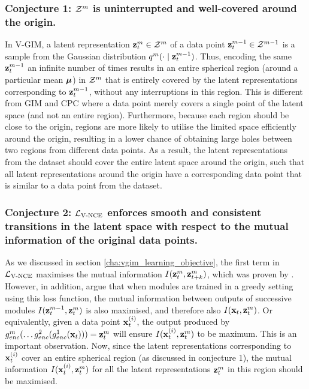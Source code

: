 		\subsubsection{Conjecture 1: $\mathcal{Z}^m$ is uninterrupted and well-covered around the origin.}
			In V-GIM, a latent representation $\mathbf{z}_t^m \in \mathcal{Z}^m$ of a data point $\mathbf{z}_t^{m-1} \in \mathcal{Z}^{m-1}$ is a sample from the Gaussian distribution $q^m(\cdot \mid \mathbf{z}_t^{m-1})$. Thus, encoding the same $\mathbf{z}_t^{m-1}$ an infinite number of times results in an entire spherical region (around a particular mean $\bm{\mu}$) in $\mathcal{Z}^m$ that is entirely covered by the latent representations corresponding to $\mathbf{z}_t^{m-1}$, without any interruptions in this region. This is different from GIM and CPC where a data point merely covers a single point of the latent space (and not an entire region). Furthermore, because each region should be close to the origin, regions are more likely to utilise the limited space efficiently around the origin, resulting in a lower chance of obtaining large holes between two regions from different data points. As a result, the latent representations from the dataset should cover the entire latent space around the origin, such that all latent representations around the origin have a corresponding data point that is similar to a data point from the dataset.
		
	
		\subsubsection{Conjecture 2: $\mathcal{L}_{\text{V-NCE}}$ enforces smooth and consistent transitions in the latent space with respect to the mutual information of the original data points.}
			As we discussed in section \ref{cha:vgim_learning_objective}, the first term in $\mathcal{L}_{\text{V-NCE}}$ maximises the mutual information $I(\mathbf{z}_t^{m}, \mathbf{z}_{t+k}^m)$, which was proven by \cite{oordRepresentationLearningContrastive2019}. However, in addition, \cite{lowePuttingEndEndtoEnd2020a} argue that when modules are trained in a greedy setting using this loss function, the mutual information between outputs of successive modules $I(\mathbf{z}_t^{m-1}, \mathbf{z}_t^{m})$ is also maximised, and therefore also $I(\mathbf{x}_t, \mathbf{z}_t^{m})$. Or equivalently, given a data point $\mathbf{x}_t^{(i)}$, the output produced by $ g_{enc}^m ( \dots	g_{enc}^2(g_{enc}^1(\mathbf{x}_t))) = \mathbf{z}_t^m$ will ensure $I(\mathbf{x}_t^{(i)}, \mathbf{z}_t^{m})$ to be maximum. This is an important observation. Now, since the latent representations corresponding to $\mathbf{x}_t^{(i)}$ cover an entire spherical region (as discussed in conjecture 1), the mutual information $I(\mathbf{x}_t^{(i)}, \mathbf{z}_t^{m})$ for all the latent representations $\mathbf{z}_t^{m}$ in this region should be maximised.
			
